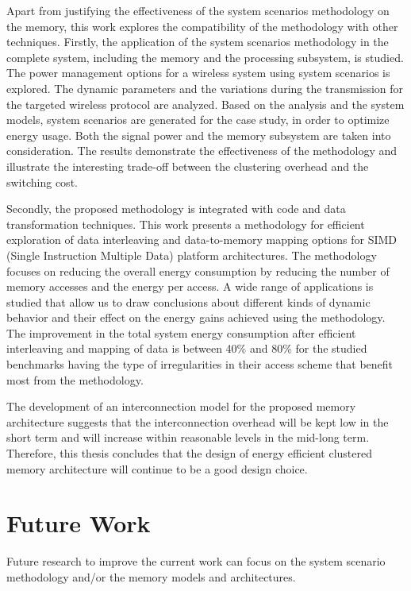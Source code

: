 Apart from justifying the effectiveness of the system scenarios methodology on the memory, this work explores the compatibility of the methodology with other techniques.
Firstly, the application of the system scenarios methodology in the complete system, including the memory and the processing subsystem, is studied.
The power management options for a wireless system using system scenarios is explored. 
The dynamic parameters and the variations during the transmission for the targeted wireless protocol are analyzed. 
Based on the analysis and the system models, system scenarios are generated for the case study, in order to optimize energy usage. 
Both the signal power and the memory subsystem are taken into consideration. 
The results demonstrate the effectiveness of the methodology and illustrate the interesting trade-off between the clustering overhead and the switching cost. 

Secondly, the proposed methodology is integrated with code and data transformation techniques.
This work presents a methodology for efficient exploration of data interleaving and data-to-memory mapping options for SIMD (Single Instruction Multiple Data) platform architectures.
The methodology focuses on reducing the overall energy consumption by reducing the number of memory accesses and the energy per access.
A wide range of applications is studied that allow us to draw conclusions about different kinds of dynamic behavior and their effect on the energy gains achieved using the methodology. 
The improvement in the total system energy consumption after efficient interleaving and mapping of data is between 40\% and 80\% for the studied benchmarks having the type of irregularities in their access scheme that benefit most from the methodology.

The development of an interconnection model for the proposed memory architecture suggests that the interconnection overhead will be kept low in the short term and will increase within reasonable levels in the mid-long term.
Therefore, this thesis concludes that the design of energy efficient clustered memory architecture will continue to be a good design choice.

\section{Future Work}

Future research to improve the current work can focus on the system scenario methodology and/or the memory models and architectures.

